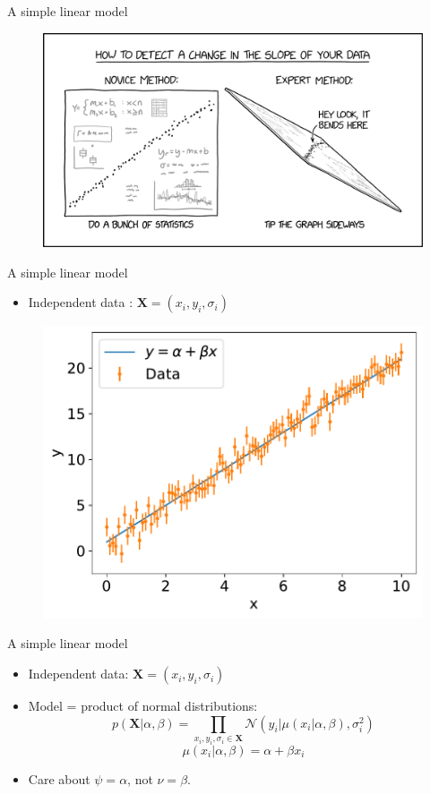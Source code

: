 \documentclass[
aspectratio=169,
14pt,
professionalfonts
]{beamer}
\newcommand{\arrow}{~\ding{220}~}
\begin{document}
\begin{frame}{A simple linear model}
    \begin{figure}
        \centering
        \href{https://xkcd.com/}{
        \includegraphics[width=0.8\linewidth]{../plots/change_in_slope_2x.png}
        }
    \end{figure}
\end{frame}

\begin{frame}{A simple linear model}

    \begin{itemize}
        \item Independent data : $\boldsymbol{X} = (x_i, y_i, \sigma_i)$
    \end{itemize}

    \begin{figure}
        \centering
        \includegraphics[width=0.5\linewidth]{../plots/linear_data.pdf}
    \end{figure}

\end{frame}

\begin{frame}{A simple linear model}
    \begin{itemize}
        \item Independent data: $\boldsymbol{X} = (x_i, y_i, \sigma_i)$
        \item[\arrow] Model = product of normal distributions:
        $$ p(\boldsymbol{X}|\alpha, \beta) = \prod_{x_i, y_i,\sigma_i \in \boldsymbol{X}}\mathcal{N}(y_i | \mu(x_i|\alpha, \beta), \sigma_i^2)$$
        $$\mu(x_i|\alpha, \beta) = \alpha + \beta x_i$$
         \item Care about $\psi = \alpha$, not $\nu=\beta$.
    \end{itemize}
\end{frame}
\end{document}
